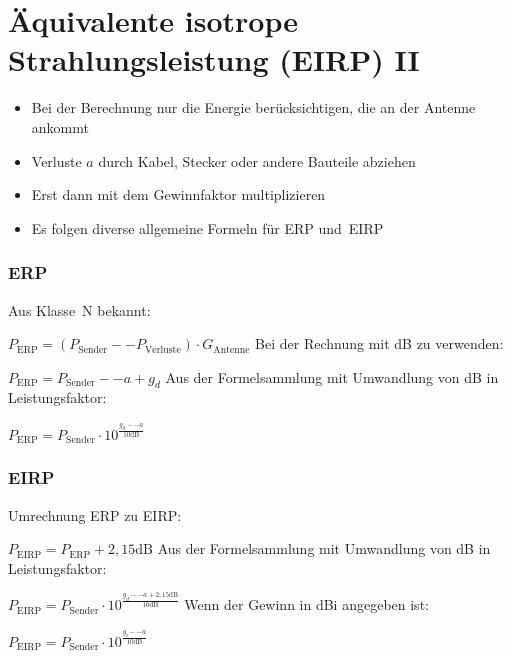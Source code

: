 
\section{Äquivalente isotrope Strahlungsleistung (EIRP) II}
\label{section:aequivalente_isotrope_strahlungsleistung_eirp_2}
\begin{frame}%
\begin{itemize}
  \item Bei der Berechnung nur die Energie berücksichtigen, die an der Antenne ankommt
  \item Verluste $a$ durch Kabel, Stecker oder andere Bauteile abziehen
  \item Erst dann mit dem Gewinnfaktor multiplizieren
  \item Es folgen diverse allgemeine Formeln für ERP und EIRP
  \end{itemize}
\end{frame}

\begin{frame}
\frametitle{ERP}
Aus Klasse~N bekannt:

$P_{\mathrm{ERP}} = (P_{\mathrm{Sender}} -- P_{\mathrm{Verluste}}) \cdot G_{\mathrm{Antenne}}$
    \pause
    Bei der Rechnung mit dB zu verwenden:

$P_{\mathrm{ERP}} = P_{\mathrm{Sender}} -- a + g_d$
    \pause
    Aus der Formelsammlung mit Umwandlung von dB in Leistungsfaktor:

$P_{\mathrm{ERP}} = P_{\mathrm{Sender}} \cdot 10^{\frac{g_d -- a}{10\mathrm{dB}}}$



\end{frame}

\begin{frame}
\frametitle{EIRP}
Umrechnung ERP zu EIRP:

$P_{\mathrm{EIRP}} = P_{\mathrm{ERP}} + 2,15 \mathrm{dB}$
    \pause
    Aus der Formelsammlung mit Umwandlung von dB in Leistungsfaktor:

$P_{\mathrm{EIRP}} = P_{\mathrm{Sender}} \cdot 10^{\frac{g_d -- a + 2,15\mathrm{dB}}{10\mathrm{dB}}}$
    \pause
    Wenn der Gewinn in dBi angegeben ist:

$P_{\mathrm{EIRP}} = P_{\mathrm{Sender}} \cdot 10^{\frac{g_i -- a}{10\mathrm{dB}}}$



\end{frame}

